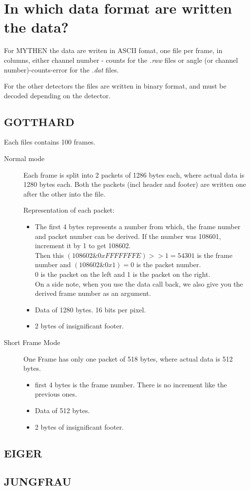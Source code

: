 \section{In which data format are written the data?} \label{sec:dataFormat}

For MYTHEN the data are writen in ASCII fomat, one file per frame, in columns, either channel number - counts for the \textit{.raw} files or angle (or channel number)-counts-error for the \textit{.dat} files.

For the other detectors the files are written in binary format, and must be decoded depending on the detector.

\subsection{GOTTHARD}
Each files contains 100 frames.
\begin{description}
\item[Normal mode]
Each frame is split into 2 packets of 1286 bytes each, where actual data is 1280 bytes each. Both the packets (incl header and footer) are written one after the other into the file.

Representation of each packet:
\begin{itemize}
\item
The first 4 bytes represents a number from which, the frame number and packet number can be derived.
If the number was 108601, increment it by 1 to get 108602.\\
Then this $(108602\&0xFFFFFFFE)>>1 = 54301$ is the frame number
and  $(108602\&0x1) =0$ is the packet number.\\
0 is the packet on the left and 1 is the packet on the right.\\
On a side note, when you use the data call back, we also give you the derived frame number as an argument.

\item Data of 1280 bytes. 16 bits per pixel.

\item  2 bytes of insignificant footer.
\end{itemize}

\item[Short Frame Mode]
One Frame has only one packet of 518 bytes, where actual data is 512 bytes.
\begin{itemize}
\item   first 4 bytes is the frame number. There is no increment like the previous ones.
\item   Data of 512 bytes.
\item   2 bytes of insignificant footer.
\end{itemize}

\end{description}

\subsection{EIGER}

\subsection{JUNGFRAU}

